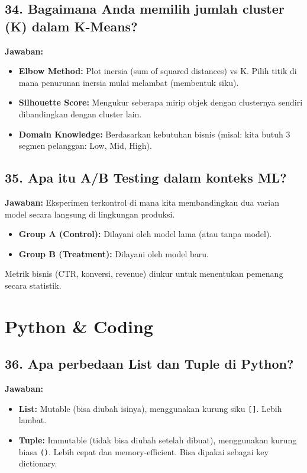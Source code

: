 \subsection{34. Bagaimana Anda memilih jumlah cluster (K) dalam K-Means?}
\textbf{Jawaban:}
\begin{itemize}
    \item \textbf{Elbow Method:} Plot inersia (sum of squared distances) vs K. Pilih titik di mana penurunan inersia mulai melambat (membentuk siku).
    \item \textbf{Silhouette Score:} Mengukur seberapa mirip objek dengan clusternya sendiri dibandingkan dengan cluster lain.
    \item \textbf{Domain Knowledge:} Berdasarkan kebutuhan bisnis (misal: kita butuh 3 segmen pelanggan: Low, Mid, High).
\end{itemize}

\subsection{35. Apa itu A/B Testing dalam konteks ML?}
\textbf{Jawaban:}
Eksperimen terkontrol di mana kita membandingkan dua varian model secara langsung di lingkungan produksi.
\begin{itemize}
    \item \textbf{Group A (Control):} Dilayani oleh model lama (atau tanpa model).
    \item \textbf{Group B (Treatment):} Dilayani oleh model baru.
\end{itemize}
Metrik bisnis (CTR, konversi, revenue) diukur untuk menentukan pemenang secara statistik.

\section{Python & Coding}

\subsection{36. Apa perbedaan List dan Tuple di Python?}
\textbf{Jawaban:}
\begin{itemize}
    \item \textbf{List:} Mutable (bisa diubah isinya), menggunakan kurung siku \texttt{[]}. Lebih lambat.
    \item \textbf{Tuple:} Immutable (tidak bisa diubah setelah dibuat), menggunakan kurung biasa \texttt{()}. Lebih cepat dan memory-efficient. Bisa dipakai sebagai key dictionary.
\end{itemize}

